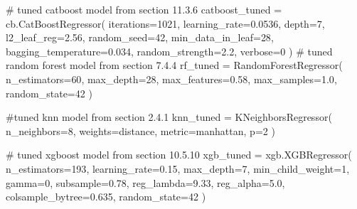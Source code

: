 \documentclass[
  letterpaper,
  DIV=11,
  numbers=noendperiod]{scrreprt}
\newenvironment{Shaded}{\begin{snugshade}}{\end{snugshade}}
\newcommand{\CommentTok}[1]{\textcolor[rgb]{0.37,0.37,0.37}{#1}}
\newcommand{\DecValTok}[1]{\textcolor[rgb]{0.68,0.00,0.00}{#1}}
\newcommand{\FloatTok}[1]{\textcolor[rgb]{0.68,0.00,0.00}{#1}}
\newcommand{\NormalTok}[1]{\textcolor[rgb]{0.00,0.23,0.31}{#1}}
\newcommand{\OperatorTok}[1]{\textcolor[rgb]{0.37,0.37,0.37}{#1}}
\newcommand{\StringTok}[1]{\textcolor[rgb]{0.13,0.47,0.30}{#1}}
\begin{document}
\begin{Shaded}
\begin{Highlighting}[]
\CommentTok{\# tuned catboost model from section 11.3.6}
\NormalTok{catboost\_tuned }\OperatorTok{=}\NormalTok{ cb.CatBoostRegressor(}
\NormalTok{    iterations}\OperatorTok{=}\DecValTok{1021}\NormalTok{,}
\NormalTok{    learning\_rate}\OperatorTok{=}\FloatTok{0.0536}\NormalTok{,}
\NormalTok{    depth}\OperatorTok{=}\DecValTok{7}\NormalTok{,}
\NormalTok{    l2\_leaf\_reg}\OperatorTok{=}\FloatTok{2.56}\NormalTok{,}
\NormalTok{    random\_seed}\OperatorTok{=}\DecValTok{42}\NormalTok{,}
\NormalTok{    min\_data\_in\_leaf}\OperatorTok{=}\DecValTok{28}\NormalTok{,}
\NormalTok{    bagging\_temperature}\OperatorTok{=}\FloatTok{0.034}\NormalTok{,}
\NormalTok{    random\_strength}\OperatorTok{=}\FloatTok{2.2}\NormalTok{,}
\NormalTok{    verbose}\OperatorTok{=}\DecValTok{0}
\NormalTok{)}
\CommentTok{\# tuned random forest model from section 7.4.4}
\NormalTok{rf\_tuned }\OperatorTok{=}\NormalTok{ RandomForestRegressor(}
\NormalTok{    n\_estimators}\OperatorTok{=}\DecValTok{60}\NormalTok{,}
\NormalTok{    max\_depth}\OperatorTok{=}\DecValTok{28}\NormalTok{,}
\NormalTok{    max\_features}\OperatorTok{=}\FloatTok{0.58}\NormalTok{,}
\NormalTok{    max\_samples}\OperatorTok{=}\FloatTok{1.0}\NormalTok{,}
\NormalTok{    random\_state}\OperatorTok{=}\DecValTok{42}
\NormalTok{)}

\CommentTok{\#tuned knn model from section 2.4.1}
\NormalTok{knn\_tuned }\OperatorTok{=}\NormalTok{ KNeighborsRegressor(}
\NormalTok{    n\_neighbors}\OperatorTok{=}\DecValTok{8}\NormalTok{,}
\NormalTok{    weights}\OperatorTok{=}\StringTok{\textquotesingle{}distance\textquotesingle{}}\NormalTok{,}
\NormalTok{    metric}\OperatorTok{=}\StringTok{\textquotesingle{}manhattan\textquotesingle{}}\NormalTok{,}
\NormalTok{    p}\OperatorTok{=}\DecValTok{2}
\NormalTok{)}

\CommentTok{\# tuned xgboost model from section  10.5.10}
\NormalTok{xgb\_tuned }\OperatorTok{=}\NormalTok{ xgb.XGBRegressor(}
\NormalTok{    n\_estimators}\OperatorTok{=}\DecValTok{193}\NormalTok{,}
\NormalTok{    learning\_rate}\OperatorTok{=}\FloatTok{0.15}\NormalTok{,}
\NormalTok{    max\_depth}\OperatorTok{=}\DecValTok{7}\NormalTok{,}
\NormalTok{    min\_child\_weight}\OperatorTok{=}\DecValTok{1}\NormalTok{,}
\NormalTok{    gamma}\OperatorTok{=}\DecValTok{0}\NormalTok{,}
\NormalTok{    subsample}\OperatorTok{=}\FloatTok{0.78}\NormalTok{,}
\NormalTok{    reg\_lambda}\OperatorTok{=}\FloatTok{9.33}\NormalTok{,}
\NormalTok{    reg\_alpha}\OperatorTok{=}\FloatTok{5.0}\NormalTok{,}
\NormalTok{    colsample\_bytree}\OperatorTok{=}\FloatTok{0.635}\NormalTok{,}
\NormalTok{    random\_state}\OperatorTok{=}\DecValTok{42}
\NormalTok{)}
\end{Highlighting}
\end{Shaded}
\end{document}
